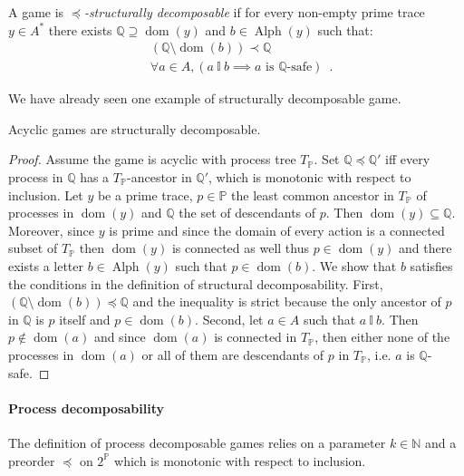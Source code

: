 \documentclass[a4paper,UKenglish]{lipics-v2016}
\newcommand{\NN}{\mathbb{N}}
\newcommand{\PP}{\mathbb{P}}
\newcommand{\QQ}{\mathbb{Q}}
\newcommand{\ind}{~\mathbb{I}~}
\DeclareMathOperator{\dom}{dom}
\DeclareMathOperator{\alphabet}{Alph}
\begin{document}
\begin{definition}
\label{unif}
A game is \emph{$\preceq$-structurally decomposable}
if for every non-empty prime trace $y\in A^*$
there exists $\QQ\supseteq \dom(y)$
and $b\in\alphabet(y)$ 
such that:
\begin{align*}
&(\QQ \setminus \dom(b)) \prec \QQ\\
&\forall a \in A, (a \ind b \implies \text{$a$ is $\QQ$-safe})\enspace.
\end{align*}
\end{definition}

We have already seen one example of structurally decomposable game.

\begin{lemma}\label{lem:acyclic}
Acyclic games are structurally decomposable.
\end{lemma}
\begin{proof}
Assume the game is acyclic with process tree $T_\PP$.
Set 
$\QQ \preceq \QQ'$ iff 
every process in $\QQ$ has a $T_\PP$-ancestor in $\QQ'$, which is  monotonic with respect to inclusion.
Let $y$ be a prime trace,
$p\in \PP$ the least common ancestor
in $T_\PP$ of processes in $\dom(y)$ and $\QQ$ the set of descendants of $p$.
Then $\dom(y) \subseteq \QQ$.
Moreover, since $y$ is prime and since the domain of every action is a connected subset of $T_\PP$
then $\dom(y)$ is connected as well thus $p\in\dom(y)$
and there exists a letter $b \in\alphabet(y)$ such that $p\in\dom(b)$.
We show that $b$ satisfies the conditions in the definition of structural decomposability.
First, $(\QQ \setminus \dom(b))\preceq \QQ$
and the inequality is strict because 
the only ancestor of $p$ in $\QQ$ is $p$ itself and $p\in\dom(b)$.
Second, let $a \in A$ such that $a\ind b$.
Then $p\not \in \dom(a)$ and since $\dom(a)$ is connected in $T_\PP$,
then either none of the processes in $\dom(a)$ or
all of them are descendants of $p$ in $T_\PP$, i.e. $a$ is $\QQ$-safe.
\end{proof}




\paragraph*{Process decomposability}


The definition of process decomposable games relies on
a parameter $k\in \NN$ and a preorder $\preceq$ on $2^\PP$
which is 
monotonic with respect to inclusion.
\end{document}
